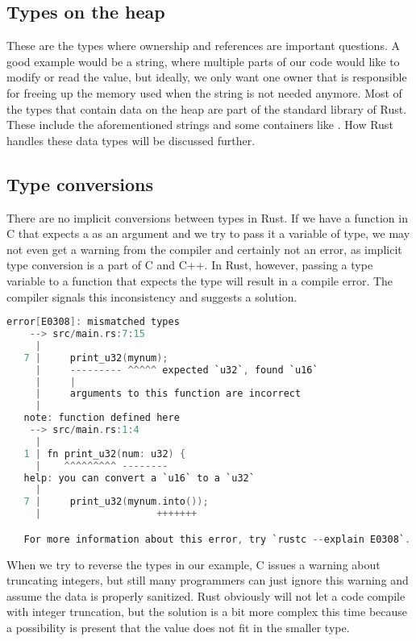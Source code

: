 \subsection{Types on the heap}

These are the types where ownership and references are important questions. A good example would be a string, where multiple parts of our code would like to modify or read the value, but ideally, we only want one owner that is responsible for freeing up the memory used when the string is not needed anymore. Most of the types that contain data on the heap are part of the standard library of Rust. These include the aforementioned strings and some containers like . How Rust handles these data types will be discussed further.

\subsection{Type conversions}

There are no implicit conversions between types in Rust. If we have a function in C that expects a  as an argument and we try to pass it a variable of  type, we may not even get a warning from the compiler and certainly not an error, as implicit type conversion is a part of C and C++. In Rust, however, passing a  type variable to a function that expects the  type will result in a compile error. The compiler signals this inconsistency and suggests a solution.

\begin{lstlisting}[language=C,frame=single,float=!ht,label={lst:rust-conv-error},caption={Rust Type Conversion Error}]
    error[E0308]: mismatched types
    --> src/main.rs:7:15
     |
   7 |     print_u32(mynum);
     |     --------- ^^^^^ expected `u32`, found `u16`
     |     |
     |     arguments to this function are incorrect
     |
   note: function defined here
    --> src/main.rs:1:4
     |
   1 | fn print_u32(num: u32) {
     |    ^^^^^^^^^ --------
   help: you can convert a `u16` to a `u32`
     |
   7 |     print_u32(mynum.into());
     |                    +++++++

   For more information about this error, try `rustc --explain E0308`.
\end{lstlisting}

When we try to reverse the types in our example, C issues a warning about truncating integers, but still many programmers can just ignore this warning and assume the data is properly sanitized. Rust obviously will not let a code compile with integer truncation, but the solution is a bit more complex this time because a possibility is present that the value does not fit in the smaller type.

